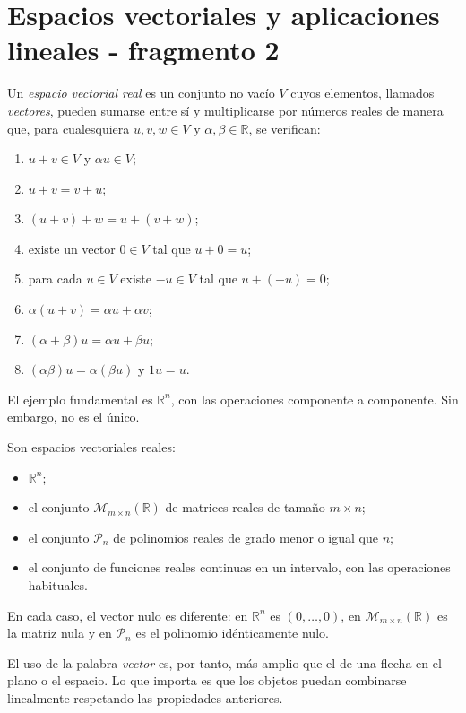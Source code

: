 \section{Espacios vectoriales y aplicaciones lineales - fragmento 2}
\begin{definition}
Un \emph{espacio vectorial real} es un conjunto no vacío $V$ cuyos elementos, llamados \emph{vectores}, pueden sumarse entre sí y multiplicarse por números reales de manera que, para cualesquiera $u,v,w\in V$ y $\alpha,\beta\in\mathbb{R}$, se verifican:
\begin{enumerate}
\item $u+v\in V$ y $\alpha u\in V$;
\item $u+v=v+u$;
\item $(u+v)+w=u+(v+w)$;
\item existe un vector $0\in V$ tal que $u+0=u$;
\item para cada $u\in V$ existe $-u\in V$ tal que $u+(-u)=0$;
\item $\alpha(u+v)=\alpha u+\alpha v$;
\item $(\alpha+\beta)u=\alpha u+\beta u$;
\item $(\alpha\beta)u=\alpha(\beta u)$ y $1u=u$.
\end{enumerate}
\end{definition}

El ejemplo fundamental es $\mathbb{R}^n$, con las operaciones componente a componente. Sin embargo, no es el único.

\begin{example}
Son espacios vectoriales reales:
\begin{itemize}
\item $\mathbb{R}^n$;
\item el conjunto $\mathcal M_{m\times n}(\mathbb{R})$ de matrices reales de tamaño $m\times n$;
\item el conjunto $\mathcal P_n$ de polinomios reales de grado menor o igual que $n$;
\item el conjunto de funciones reales continuas en un intervalo, con las operaciones habituales.
\end{itemize}
En cada caso, el vector nulo es diferente: en $\mathbb{R}^n$ es $(0,\ldots,0)$, en $\mathcal M_{m\times n}(\mathbb{R})$ es la matriz nula y en $\mathcal P_n$ es el polinomio idénticamente nulo.
\end{example}

El uso de la palabra \emph{vector} es, por tanto, más amplio que el de una flecha en el plano o el espacio. Lo que importa es que los objetos puedan combinarse linealmente respetando las propiedades anteriores.

